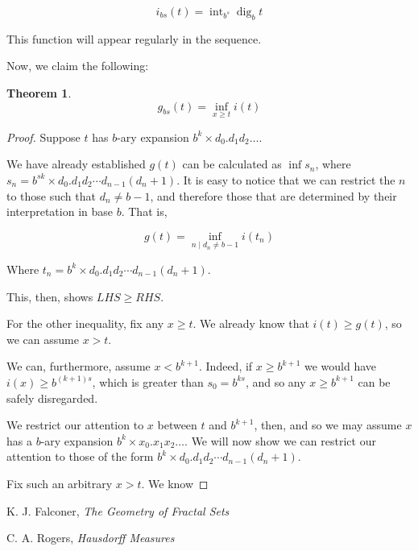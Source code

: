 \documentclass[11pt]{amsart}
\newtheorem{theorem}{Theorem}
\DeclareMathOperator{\dig}{dig}
\DeclareMathOperator{\intr}{int}
\begin{document}
\[ i_{bs}(t) = \intr_{b^s} \dig_b t \]

This function will appear regularly in the sequence.

Now, we claim the following:

\begin{theorem}
\[g_{bs}(t) = \inf_{x \geq t} i(t)\]
\end{theorem}

\begin{proof}
Suppose $t$ has $b$-ary expansion $b^k \times d_0 . d_1 d_2 \dots$.

We have already established $g(t)$ can be calculated as $\inf s_n$, where $s_n = b^{sk} \times d_0 . d_1 d_2 \cdots d_{n-1} (d_n + 1)$. It is easy to notice that we can restrict the $n$ to those such that $d_n \neq b-1$, and therefore those that are determined by their interpretation in base $b$. That is,

\[g(t) = \inf_{n \mid d_n \neq b-1} i(t_n) \]

Where $t_n = b^k \times d_0 . d_1 d_2 \cdots d_{n-1} (d_n + 1)$.

This, then, shows $LHS \geq RHS$.

For the other inequality, fix any $x \geq t$. We already know that $i(t) \geq g(t)$, so we can assume $x > t$.

We can, furthermore, assume $x < b^{k+1}$. Indeed, if $x \geq b^{k+1}$ we would have $i(x) \geq b^{(k+1)s}$, which is greater than $s_0 = b^{ks}$, and so any $x \geq b^{k+1}$ can be safely disregarded.

We restrict our attention to $x$ between $t$ and $b^{k+1}$, then, and so we may assume $x$ has a $b$-ary expansion $b^k \times x_0 . x_1 x_2 \dots$. We will now show we can restrict our attention to those of the form $b^k \times d_0 . d_1 d_2 \cdots d_{n-1} (d_n + 1)$.

Fix such an arbitrary $x > t$. We know
\end{proof}

\begin{thebibliography}{1}
K. J. Falconer, \textit{The Geometry of Fractal Sets}

C. A. Rogers, \textit{Hausdorff Measures}

\end{thebibliography}
\end{document}
